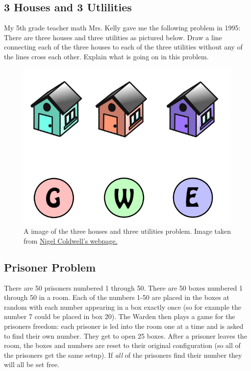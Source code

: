 \documentclass[]{article}
\numberwithin{equation}{section}
\theoremstyle{definition}
\theoremstyle{remark}
\begin{document}
\subsection{3 Houses and 3 Utlilities }
	My 5th grade teacher math Mrs. Kelly gave me the following problem in 1995: 
	There are three houses and three utilities as pictured below.
	Draw a line connecting each of the three houses to each of the three utilities without any of the lines cross each other. Explain what is going on in this problem.
	\begin{figure}[h]
		\begin{center}
			\includegraphics[scale=0.25]{three-houses.png}
		\end{center}
		\caption{A image of the three houses and three utilities problem.  Image taken from \href{http://puzzles.nigelcoldwell.co.uk/twentysix.htm}{Nigel Coldwell's webpage.} }
	\end{figure}
	
\subsection{Prisoner Problem }
There are 50 prisoners numbered 1 through 50.
There are 50 boxes numbered 1 through 50 in a room. 
Each of the numbers 1-50 are placed in the boxes at random with each number appearing in a box exactly once (so for example the number 7 could be placed in box 20).
The Warden then plays a game for the prisoners freedom: each prisoner is led into the room one at a time and is asked to find their own number.
They get to open 25 boxes.
After a prisoner leaves the room, the boxes and numbers are reset to their original configuration (so all of the prisoners get the same setup). 
If \emph{all} of the prisoners find their number they will all be set free.
\end{document}
